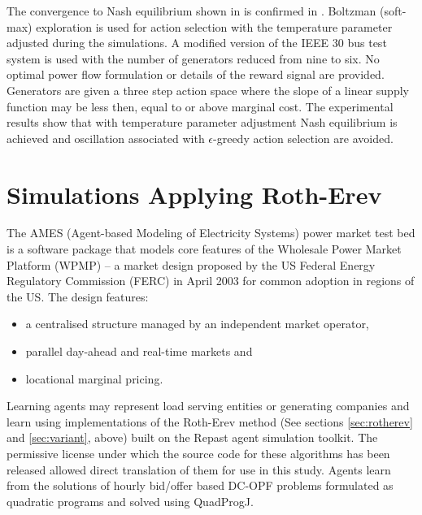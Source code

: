 The convergence to Nash equilibrium shown in \cite{krause:nash04} is confirmed
in \cite{sistani:06}.  Boltzman (soft-max) exploration is used for action
selection with the temperature parameter adjusted during the simulations.  A
modified version of the IEEE 30 bus test system is used with the number of
generators reduced from nine to six.  No optimal power flow formulation or
details of the reward signal are provided.  Generators are given a three step
action space where the slope of a linear supply function may be less then, equal
to or above marginal cost.  The experimental results show that with temperature
parameter adjustment Nash equilibrium is achieved and oscillation associated
with $\epsilon$-greedy action selection are avoided.


\section{Simulations Applying Roth-Erev}
The AMES (Agent-based Modeling of Electricity Systems) power market test bed is
a software package that models core features of the Wholesale Power Market
Platform (WPMP) -- a market design proposed by the US Federal Energy Regulatory
Commission (FERC) in April 2003 for common adoption in regions of the
US\cite{tesfatsi:wpmp}. The design features:
\begin{itemize}
  \item a centralised structure managed by an independent market operator,
  \item parallel day-ahead and real-time markets and
  \item locational marginal pricing.
\end{itemize}
Learning agents may represent load serving entities or generating companies and
learn using implementations of the Roth-Erev method (See sections
\ref{sec:rotherev} and \ref{sec:variant}, above) built on the Repast agent
simulation toolkit\cite{gieseler:thesis}.  The permissive license under which
the source code for these algorithms has been released allowed direct
translation of them for use in this study.  Agents learn from the solutions of
hourly bid/offer based DC-OPF problems formulated as quadratic programs and
solved using QuadProgJ\cite{tesfatsi:dcopf}.


